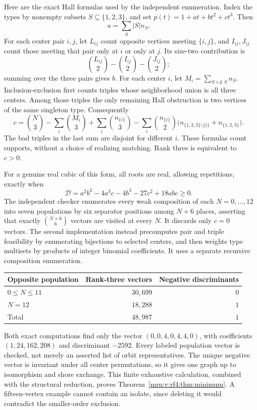 \documentclass[11pt,a4paper]{article}
\theoremstyle{remark}\newtheorem{remark}[theorem]{Remark}
\begin{document}
Here are the exact Hall formulas used by the independent enumeration. Index the types by nonempty subsets $S\subseteq\{1,2,3\}$, and set $p(t)=1+at+bt^2+ct^3$. Then
\[
a=\sum_S |S|n_S.
\]
For each center pair $i,j$, let $L_{ij}$ count opposite vertices meeting $\{i,j\}$, and $I_{ij},J_{ij}$ count those meeting that pair only at $i$ or only at $j$. Its size-two contribution is
\[
\binom{L_{ij}}2-\binom{I_{ij}}2-\binom{J_{ij}}2;
\]
summing over the three pairs gives $b$. For each center $i$, let $M_i=\sum_{S:i\notin S}n_S$. Inclusion-exclusion first counts triples whose neighborhood union is all three centers. Among those triples the only remaining Hall obstruction is two vertices of the same singleton type. Consequently
\begin{equation}\label{mrn:v:rf4:eq:hall-cubic}
c=\binom N3-\sum_i\binom{M_i}3+\sum_i\binom{n_{\{i\}}}3
-\sum_i\binom{n_{\{i\}}}2
\bigl(n_{\{1,2,3\}\setminus\{i\}}+n_{\{1,2,3\}}\bigr).
\end{equation}
The bad triples in the last sum are disjoint for different $i$. These formulas count supports, without a choice of realizing matching. Rank three is equivalent to $c>0$.

For a genuine real cubic of this form, all roots are real, allowing repetitions, exactly when
\begin{equation}\label{mrn:v:rf4:eq:cubic-discriminant}
\mathcal D=a^2b^2-4a^3c-4b^3-27c^2+18abc\ge0.
\end{equation}
The independent checker enumerates every weak composition of each $N=0,\ldots,12$ into seven populations by six separator positions among $N+6$ places, asserting that exactly $\binom{N+6}{6}$ vectors are visited at every $N$. It discards only $c=0$ vectors. The second implementation instead precomputes pair and triple feasibility by enumerating bijections to selected centers, and then weights type multisets by products of integer binomial coefficients. It uses a separate recursive composition enumeration.

\begin{center}
\begin{tabular}{@{}lrr@{}}
\toprule
Opposite population & Rank-three vectors & Negative discriminants\\
\midrule
$0\le N\le11$ & $30{,}699$ & $0$\\
$N=12$ & $18{,}288$ & $1$\\
\midrule
Total & $48{,}987$ & $1$\\
\bottomrule
\end{tabular}
\end{center}
Both exact computations find only the vector $(0,0,4,0,4,4,0)$, with coefficients $(1,24,162,208)$ and discriminant $-2592$. Every labeled population vector is checked, not merely an asserted list of orbit representatives. The unique negative vector is invariant under all center permutations, so it gives one graph up to isomorphism and shore exchange. This finite exhaustive calculation, combined with the structural reduction, proves Theorem~\ref{mrn:v:rf4:thm:minimum}. A fifteen-vertex example cannot contain an isolate, since deleting it would contradict the smaller-order exclusion.
\end{document}

